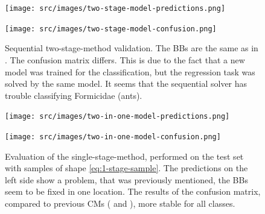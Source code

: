 \begin{figure}
    \centering
    \begin{multicols}{2}
        \begin{minipage}{.45\textwidth}
            \texttt{[image: src/images/two-stage-model-predictions.png]}
        \end{minipage}
        \columnbreak
        \begin{minipage}{.45\textwidth}
            \texttt{[image: src/images/two-stage-model-confusion.png]}
        \end{minipage}
    \end{multicols}
    \caption{Sequential two-stage-method validation. The BBs are the same as in . The confusion matrix differs. This is due to the fact that a new model was trained for the classification, but the regression task was solved by the same model. It seems that the sequential solver has trouble classifying Formicidae (ants).}
    \label{fig:sequential-results}
\end{figure}

\begin{figure}
    \centering
    \begin{multicols}{2}
        \begin{minipage}{.45\textwidth}
            \texttt{[image: src/images/two-in-one-model-predictions.png]}
        \end{minipage}
        \columnbreak
        \begin{minipage}{.45\textwidth}
            \texttt{[image: src/images/two-in-one-model-confusion.png]}
        \end{minipage}
    \end{multicols}
    \caption{Evaluation of the single-stage-method, performed on the test set with samples of shape \eqref{eq:1-stage-sample}. The predictions on the left side show a problem, that was previously mentioned, the BBs seem to be fixed in one location. The results of the confusion matrix, compared to previous CMs ( and ), more stable for all classes.}
    \label{fig:single-stage-predictions}
\end{figure}

